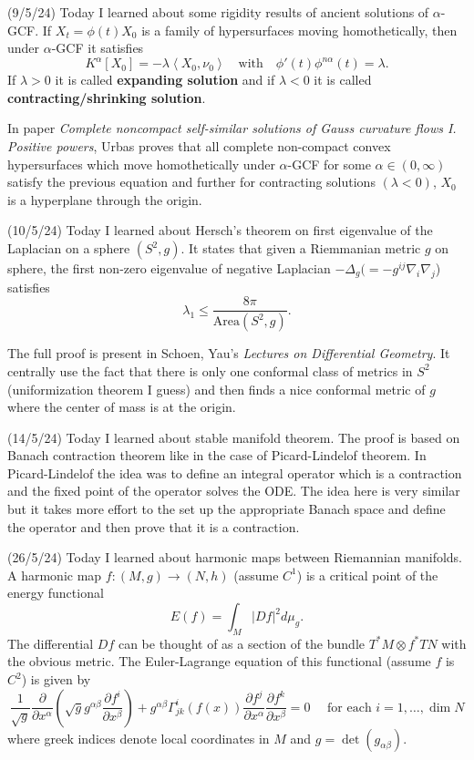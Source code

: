 \documentclass[12pt,a4paper]{article}
\begin{document}

(9/5/24) Today I learned about some rigidity results of ancient solutions of $ \alpha $-GCF. If $ X_{t} = \phi(t)X_{0} $ is a family of hypersurfaces moving homothetically, then under $ \alpha $-GCF it satisfies
\[ K^{\alpha}[X_{0}] = - \lambda \left<  X_{0}, \nu_{0}  \right> \quad \text{with} \quad \phi'(t)\phi^{n \alpha}(t) = \lambda. \]
If $ \lambda >0 $ it is called \textbf{expanding solution} and if $ \lambda <0 $ it is called \textbf{contracting/shrinking solution}. 


In paper \textit{Complete noncompact self-similar solutions
of Gauss curvature flows
I. Positive powers}, Urbas proves that all complete non-compact convex hypersurfaces which move homothetically under $ \alpha $-GCF for some $ \alpha \in (0, \infty) $ satisfy the previous equation and further for contracting solutions $ (\lambda <0) $, $ X_{0} $ is a hyperplane through the origin.


(10/5/24) Today I learned about Hersch's theorem on first eigenvalue of the Laplacian on a sphere $ (S^{2},g) $. It states that given a Riemmanian metric $ g $ on sphere, the first non-zero eigenvalue of negative Laplacian $ -\Delta_{g}( = - g^{ij}\nabla_{i}\nabla_{j} $) satisfies 
\[ \lambda_{1} \le \frac{8 \pi}{\text{Area}(S^{2},g)}. \]

The full proof is present in Schoen, Yau's \textit{Lectures on Differential Geometry}. It centrally use the fact that there is only one conformal class of metrics in $ S^{2} $ (uniformization theorem I guess) and then finds a nice conformal metric of $ g $ where the center of mass is at the origin. 

(14/5/24) Today I learned about stable manifold theorem. The proof is based on Banach contraction theorem like in the case of Picard-Lindelof theorem. In Picard-Lindelof the idea was to define an integral operator which is a contraction and the fixed point of the operator solves the ODE. The idea here is very similar but it takes more effort to the set up the appropriate Banach space and define the operator and then prove that it is a contraction.

(26/5/24) Today I learned about harmonic maps between Riemannian manifolds. A harmonic map $ f: (M,g) \to (N,h) $ (assume $ C^{1} $) is a critical point of the energy functional 
\[ E(f) = \int_{M}|Df|^{2}d \mu_{g}. \]
The differential $ Df $ can be thought of as a section of the bundle $ T^{*}M \otimes f^{*}TN $ with the obvious metric. The Euler-Lagrange equation of this functional (assume  $ f $ is $ C^{2}$) is given by 
\[ \frac{1}{\sqrt{g}} \frac{\partial}{\partial x^{\alpha}}\left(\sqrt{g}g^{\alpha \beta} \frac{\partial f^{i}}{\partial x^{\beta}}\right) + g^{\alpha \beta}\Gamma^{i}_{jk}(f(x)) \frac{\partial f^{j}}{\partial x^{\alpha}} \frac{\partial f^{k}}{\partial x^{\beta}} = 0 \quad \text{ for each } i = 1, \dots, \dim N \]
where greek indices denote local coordinates in $ M $ and $ g = \det(g_{\alpha \beta}) $.
\end{document}
